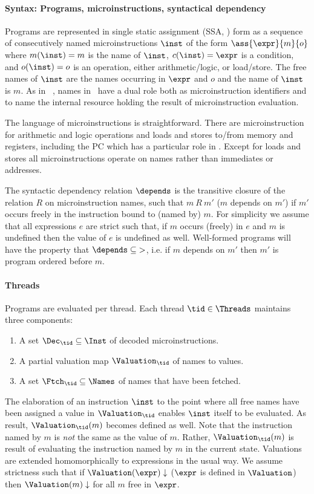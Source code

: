 \paragraph{Syntax: Programs, microinstructions, syntactical dependency}
Programs are represented in single static assignment (SSA, \cite{SSA}) form as a sequence of consecutively named microinstructions $\inst$ of the form $\ass{\expr}{m}{o}$ where $m(\inst)=m$ is the name of $\inst$, $c(\inst)=\expr$ is a condition, and $o(\inst) = o$ is an operation, either arithmetic/logic, or load/store. The free names of $\inst$ are the names occurring in $\expr$ and $o$ and the name of $\inst$ is $m$. As in \MIL\ \cite{MIL}, names in \MCMIL\ have a dual role both as microinstruction identifiers and to name the internal resource holding the result of microinstruction evaluation.

The language of microinstructions is straightforward. There are microinstruction for arithmetic and logic operations and loads and stores to/from memory and registers, including the PC which has a particular role in \MIL. Except for loads and stores all microinstructions operate on names rather than immediates or addresses.

The syntactic dependency relation $\depends$ is the transitive closure of the relation $R$ on microinstruction names, such that $m\ R\ m'$ ($m$ depends on $m'$) if $m'$ occurs freely in the instruction bound to (named by) $m$.
For simplicity we assume that all expressions $e$ are strict such that, if $m$ occurs (freely) in $e$ and $m$ is undefined then the value of $e$ is undefined as well. 
Well-formed programs will have the property that $\mbox{$\depends$}\subseteq \mbox{$>$}$, i.e. if $m$ depends on $m'$ then $m'$ is program ordered before $m$.

\paragraph{Threads}
Programs are evaluated per thread. Each thread $\tid\in\Threads$ maintains three components:
\begin{enumerate}
\item
A set $\Dec_\tid\subseteq\Inst$ of decoded microinstructions.
\item
A partial valuation map $\Valuation_\tid$ of names to values.
\item
A set $\Ftch_\tid\subseteq\Names$ of names that have been fetched.
\end{enumerate}
The elaboration of an instruction $\inst$ to the point where all free names
have been assigned a value in $\Valuation_\tid$ enables $\inst$ itself to be evaluated. As result, $\Valuation_{\tid}(m)$ becomes defined as well. Note that
the instruction named by $m$ is \emph{not} the same as the value of $m$.
Rather, $\Valuation_\tid(m)$ is result of evaluating the instruction named by
$m$ in the current state.
Valuations are extended homomorphically to expressions in the usual way. We assume strictness such that if $\Valuation(\expr)\downarrow$ ($\expr$ is defined in $\Valuation$) then $\Valuation(m)\downarrow$ for all $m$ free in $\expr$. 

